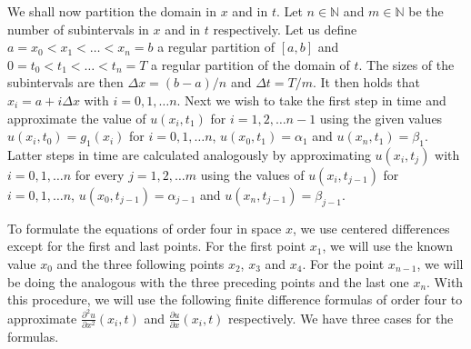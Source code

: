 \documentclass[00main.tex]{subfiles}
\begin{document}
We shall now partition the domain in $x$ and in $t$. Let $n \in \mathbb{N}$ and $m \in \mathbb{N}$ be the number of subintervals in $x$ and in $t$ respectively. Let us define $a = x_0 < x_1 < \hdots < x_n = b$ a regular partition of $[a,b]$ and $0 = t_0 < t_1 < \hdots < t_n = T$ a regular partition of the domain of $t$. The sizes of the subintervals are then $\Delta x = (b-a)/n$ and $\Delta t = T/m$. It then holds that $x_i = a+ i\Delta x$ with $i = 0, 1, \hdots n$. Next we wish to take the first step in time and approximate the value of $u(x_i, t_1)$ for $i = 1, 2, \hdots n-1$ using the given values $u(x_i, t_0) = g_1 (x_i)$ for $i=0,1, \hdots n$, $u(x_0, t_1) = \alpha_1$ and $u(x_n, t_1) = \beta_1$. Latter steps in time are calculated analogously by approximating $u(x_i, t_j)$ with $i = 0, 1, \hdots n$ for every $j = 1,2, \hdots m$ using the values of $u(x_i, t_{j-1})$ for $i=0,1, \hdots n$, $u(x_0, t_{j-1}) = \alpha_{j-1}$ and $u(x_n, t_{j-1}) = \beta_{j-1}$.

To formulate the equations of order four in space $x$, we use centered differences except for the first and last points. For the first point $x_1$, we will use the known value $x_0$ and the three following points $x_2$, $x_3$ and $x_4$. For the point $x_{n-1}$, we will be doing the analogous with the three preceding points and the last one $x_n$. With this procedure, we will use the following finite difference formulas of order four to approximate $\frac{\partial^2 u}{\partial x^2} (x_i,t)$ and $\frac{\partial u}{\partial x} (x_i,t)$ respectively. We have three cases for the formulas.

\end{document}

